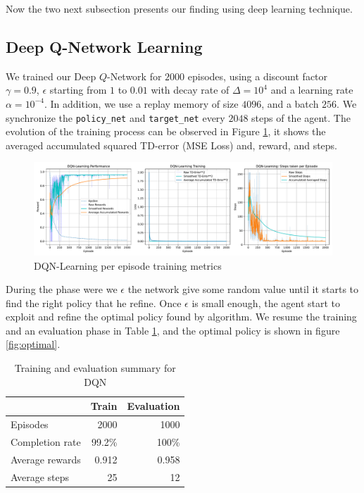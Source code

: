 Now the two next subsection presents our finding using deep learning technique.
\subsection{Deep Q-Network Learning}
We trained our  Deep $Q$-Network for $2000$ episodes, using a discount factor $\gamma=0.9$, $\epsilon$ starting from $1$ to $0.01$ with decay rate of $\Delta=10^4$ and a learning rate $\alpha=10^{-4}$. In addition, we use a replay memory of size $4096$, and a batch $256$. We synchronize the \texttt{policy\_net} and \texttt{target\_net} every $2048$ steps of the agent. The evolution of the training process can be observed in Figure \ref{fig:dqnlog}, it shows the averaged accumulated squared TD-error (MSE Loss) and, reward, and steps.
\begin{figure}[H]
	\centering
	\includegraphics[width=\linewidth]{figures/DQNLearning_episode.pdf}
	\caption{DQN-Learning per episode training metrics}
	\label{fig:dqnlog}
\end{figure}
During the phase were we $\epsilon$ the network give some random value until it starts to find the right policy that he refine. Once $\epsilon$ is small enough, the agent start to exploit and refine the optimal policy found by algorithm. We resume the training and an evaluation phase in Table \ref{tab:summ_dqn}, and the optimal policy is shown in figure \ref{fig:optimal}.
\begin{table}
	\centering
	\begin{tabular}{@{}lrr@{}}
		\cmidrule(l){2-3}
		& Train & Evaluation \\ \midrule
		Episodes        &  2000      &  1000          \\
		Completion rate &   99.2\%    &  100\%           \\
		Average rewards &   0.912    &    0.958        \\
		Average steps   &    25   &     12       \\ \bottomrule
	\end{tabular}
	\caption{Training and evaluation summary for DQN}
	\label{tab:summ_dqn}
\end{table}


